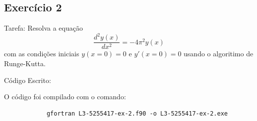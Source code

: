 \documentclass[12pt, a4paper]{article} %
\begin{document}
    \subsection{Exerc\'icio 2}

        Tarefa: Resolva a equa\c{c}\~ao
        \begin{equation*}
            \frac{d^{2}y(x)}{dx^{2}} = -4\pi^{2}y(x)
        \end{equation*}
        com as condi\c{c}\~oes iniciais $y(x=0) = 0$ e $y'(x=0) = 0$ usando o algoritimo de Runge-Kutta.

        C\'odigo Escrito:
        

        O c\'odigo foi compilado com o comando:
        \begin{verbatim}
            gfortran L3-5255417-ex-2.f90 -o L3-5255417-ex-2.exe
        \end{verbatim}
\end{document}
